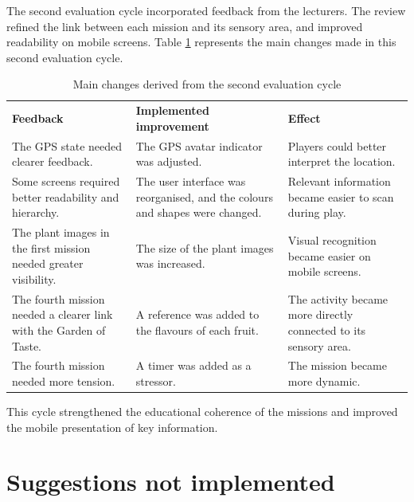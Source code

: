 The second evaluation cycle incorporated feedback from the lecturers. The review refined the link between each mission and its sensory area, and improved readability on mobile screens. Table \ref{tab:second_evaluation_cycle} represents the main changes made in this second evaluation cycle.

\begin{table}[H]
\centering
\caption{Main changes derived from the second evaluation cycle}
\label{tab:second_evaluation_cycle}
\renewcommand{\arraystretch}{1.4}
\begin{tabular}{>{\raggedright\arraybackslash}p{}
                >{\raggedright\arraybackslash}p{}
                >{\raggedright\arraybackslash}p{}}
\rowcolor[HTML]{B0C9B0}
\textbf{Feedback} & \textbf{Implemented improvement} & \textbf{Effect} \\
\rowcolor[HTML]{F0F5F0}
The GPS state needed clearer feedback. & The GPS avatar indicator was adjusted. & Players could better interpret the location. \\
\rowcolor[HTML]{DFE8DF}
Some screens required better readability and hierarchy. & The user interface was reorganised, and the colours and shapes were changed. & Relevant information became easier to scan during play. \\
\rowcolor[HTML]{F0F5F0}
The plant images in the first mission needed greater visibility. & The size of the plant images was increased. & Visual recognition became easier on mobile screens. \\
\rowcolor[HTML]{DFE8DF}
The fourth mission needed a clearer link with the Garden of Taste. & A reference was added to the flavours of each fruit. & The activity became more directly connected to its sensory area. \\
\rowcolor[HTML]{F0F5F0}
The fourth mission needed more tension. & A timer was added as a stressor. & The mission became more dynamic. \\
\end{tabular}
\end{table}

This cycle strengthened the educational coherence of the missions and improved the mobile presentation of key information.



\section{Suggestions not implemented}

